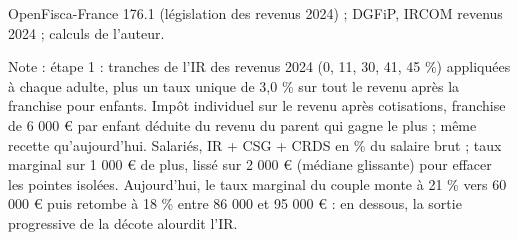 OpenFisca-France 176.1 (législation des revenus 2024) ; DGFiP, IRCOM revenus 2024 ; calculs de l'auteur.\par Note : étape 1 : tranches de l'IR des revenus 2024 (0, 11, 30, 41, 45 \%) appliquées à chaque adulte, plus un taux unique de 3,0 \% sur tout le revenu après la franchise pour enfants. Impôt individuel sur le revenu après cotisations, franchise de 6 000 \euro{} par enfant déduite du revenu du parent qui gagne le plus ; même recette qu'aujourd'hui. Salariés, IR + CSG + CRDS en \% du salaire brut ; taux marginal sur 1 000 \euro{} de plus, lissé sur 2 000 \euro{} (médiane glissante) pour effacer les pointes isolées. Aujourd'hui, le taux marginal du couple monte à 21 \% vers 60 000 \euro{} puis retombe à 18 \% entre 86 000 et 95 000 \euro{} : en dessous, la sortie progressive de la décote alourdit l'IR.
